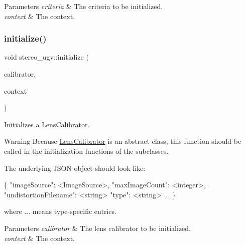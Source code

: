 \begin{DoxyParams}{Parameters}
{\em criteria} & The criteria to be initialized. \\
\hline
{\em context} & The context. \\
\hline
\end{DoxyParams}
\mbox{\label{namespacestereo__ugv_aab7c44a98ba3f61baec2e4c1c9802bee}} 
\subsubsection{\texorpdfstring{initialize()}{initialize()}\hspace{0.1cm}{\footnotesize\ttfamily [6/8]}}
{\footnotesize\ttfamily void stereo\+\_\+ugv\+::initialize (\begin{DoxyParamCaption}\item[{\hyperlink{classstereo__ugv_1_1LensCalibrator}{Lens\+Calibrator} $\ast$}]{calibrator,  }\item[{const \hyperlink{classstereo__ugv_1_1Context}{Context} \&}]{context }\end{DoxyParamCaption})}



Initializes a \hyperlink{classstereo__ugv_1_1LensCalibrator}{Lens\+Calibrator}. 

\begin{DoxyWarning}{Warning}
Because \hyperlink{classstereo__ugv_1_1LensCalibrator}{Lens\+Calibrator} is an abstract class, this function should be called in the initialization functions of the subclasses.
\end{DoxyWarning}
The underlying J\+S\+ON object should look like\+: 
\begin{DoxyCode}
\{
  \textcolor{stringliteral}{"imageSource"}: <ImageSource>,
  \textcolor{stringliteral}{"maxImageCount"}: <integer>,
  \textcolor{stringliteral}{"undistortionFilename"}: <\textcolor{keywordtype}{string}>
  \textcolor{stringliteral}{"type"}: <\textcolor{keywordtype}{string}>
  ...
\}
\end{DoxyCode}
 where ... means type-\/specific entries. 
\begin{DoxyParams}{Parameters}
{\em calibrator} & The lens calibrator to be initialized. \\
\hline
{\em context} & The context. \\
\hline
\end{DoxyParams}
\mbox{\label{namespacestereo__ugv_a8e8ff522fb8d2300fcdfc02ab0025e98}} 

